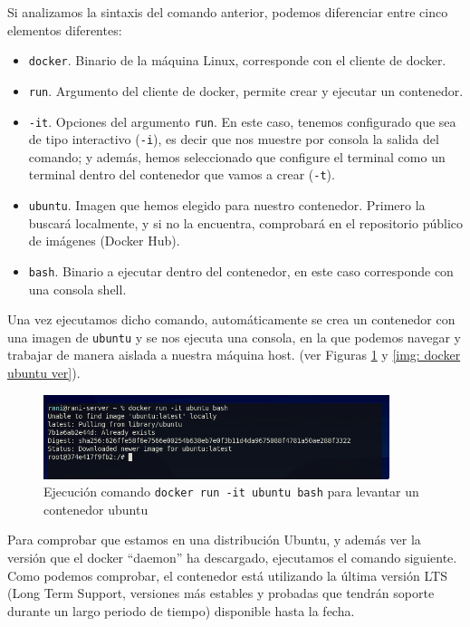 \documentclass[a4paper, oneside, 12pt]{book}
\begin{document}
	\noindent Si analizamos la sintaxis del comando anterior, podemos diferenciar entre cinco elementos diferentes:
	\begin{itemize}
		\item \texttt{docker}. Binario de la máquina Linux, corresponde con el cliente de docker.
		\item \texttt{run}. Argumento del cliente de docker, permite crear y ejecutar un contenedor.
		\item \texttt{-it}. Opciones del argumento \texttt{run}. En este caso, tenemos configurado que sea de tipo interactivo (\texttt{-i}), es decir que nos muestre por consola la salida del comando; y además, hemos seleccionado que configure el terminal como un terminal dentro del contenedor que vamos a crear (\texttt{-t}).
		\item \texttt{ubuntu}. Imagen que hemos elegido para nuestro contenedor. Primero la buscará localmente, y si no la encuentra, comprobará en el repositorio público de imágenes (Docker Hub).
		\item \texttt{bash}. Binario a ejecutar dentro del contenedor, en este caso corresponde con una consola shell.
	\end{itemize}

	\noindent Una vez ejecutamos dicho comando, automáticamente se crea un contenedor con una imagen de \texttt{ubuntu} y se nos ejecuta una consola, en la que podemos navegar y trabajar de manera aislada a nuestra máquina host. (ver Figuras \ref{img: docker ubuntu} y \ref{img: docker ubuntu ver}).
	
	\pagebreak
	
	\begin{figure}[h]
		\begin{center}
			\includegraphics[width=0.9\textwidth]{img/docker_ubuntu.png}
			\caption{Ejecución comando \texttt{docker run -it ubuntu bash} para levantar un contenedor ubuntu}
			\label{img: docker ubuntu}
		\end{center}
	\end{figure}


	\noindent Para comprobar que estamos en una distribución Ubuntu, y además ver la versión que el docker ``daemon'' ha descargado, ejecutamos el comando siguiente. Como podemos comprobar, el contenedor está utilizando la última versión LTS (Long Term Support, versiones más estables y probadas que tendrán soporte durante un largo periodo de tiempo) disponible hasta la fecha.
	
\end{document}

